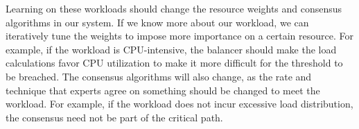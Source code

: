 Learning on these workloads should change the resource weights and consensus algorithms in our system. If we know more about our workload, we can iteratively tune the weights to impose more importance on a certain resource. For example, if the workload is CPU-intensive, the balancer should make the load calculations favor CPU utilization to make it more difficult for the threshold to be breached. The consensus algorithms will also change, as the rate and technique that experts agree on something should be changed to meet the workload. For example, if the workload does not incur excessive load distribution, the consensus need not be part of the critical path. 